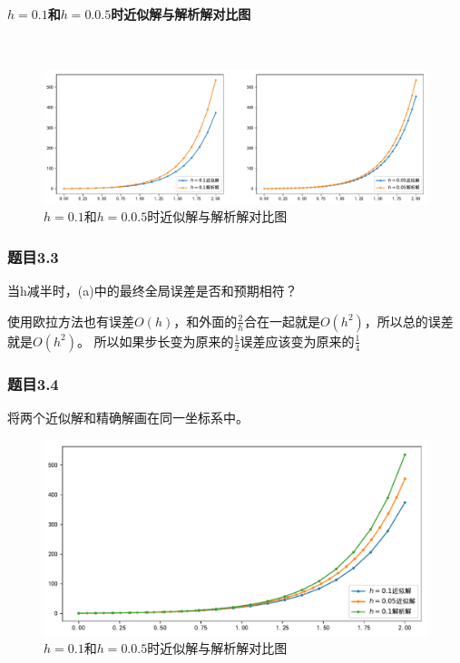 \paragraph{$h=0.1$和$h=0.0.5$时近似解与解析解对比图}
~\\
\begin{figure}[H]
	\centering
	\caption{$h=0.1$和$h=0.0.5$时近似解与解析解对比图}
	\includegraphics[width=\linewidth]{fig34.pdf}
\end{figure}

\subsubsection{题目3.3}

当h减半时，(a)中的最终全局误差是否和预期相符？

使用欧拉方法也有误差$O(h)$，和外面的$\frac{2}{h}$合在一起就是$O(h^2)$，所以总的误差就是$O(h^2)$。
所以如果步长变为原来的$\frac{1}{2}$误差应该变为原来的$\frac{1}{4}$

\subsubsection{题目3.4}

将两个近似解和精确解画在同一坐标系中。

\begin{figure}[H]
	\centering
	\caption{$h=0.1$和$h=0.0.5$时近似解与解析解对比图}
	\includegraphics[width=\linewidth]{fig35.pdf}
\end{figure}

